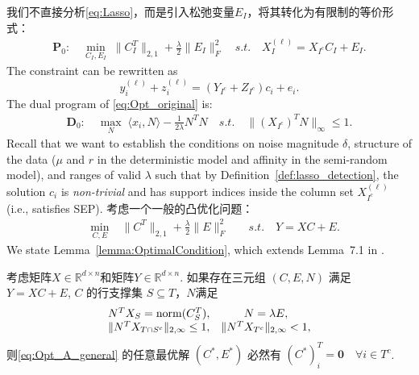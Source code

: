\documentclass{ctexart}
\begin{document}
我们不直接分析\eqref{eq:Lasso}，而是引入松弛变量$E_I$，将其转化为有限制的等价形式：
\begin{align}\label{eq:Opt_original}
  \mathbf{P}_0:\quad \min_{C_I, E_I} \;
  \|C_I^T\|_{2,1}+\frac{\lambda}{2}\|E_I\|_F^2 \quad
  s.t. \quad X^{(\ell)}_I=X_{I^c}C_I+E_I.
\end{align}
The constraint can be rewritten as
\begin{equation}\label{eq:Opt_original_equi}
  y^{(\ell)}_i+z^{(\ell)}_i=(Y_{I^c}+Z_{I^c})c_i+e_i.
\end{equation}
The dual program of \eqref{eq:Opt_original} is:
\begin{equation}\label{eq:Opt_original_dual}
  \begin{aligned}
    \mathbf{D}_0:\quad \max_{N} \; \langle x_i,N \rangle - \frac{1}{2\lambda}N^TN \quad
    s.t. \quad \|(X_{I^c})^TN\|_{\infty} \leq 1.
  \end{aligned}
\end{equation}
Recall that we want to establish the conditions on noise magnitude $\delta$, structure of the data ($\mu$ and $r$ in the deterministic model and affinity in the semi-random model), and ranges of valid $\lambda$ such that by Definition~\ref{def:lasso_detection}, the solution $c_i$ is \emph{non-trivial} and has support indices inside the column set $X^{(\ell)}_{I^c}$ (i.e., satisfies SEP).
考虑一个一般的凸优化问题：
\begin{align}\label{eq:Opt_A_general}
  \quad \min_{C, E} \; &\|C^T\|_{2,1}+\frac{\lambda}{2}\|E\|^2_F \quad &s.t. \quad Y=XC+E.
\end{align}
We state Lemma~\ref{lemma:OptimalCondition}, which extends Lemma~7.1 in \cite{soltanolkotabi2011geometric}.
\begin{lemma}\label{lemma:OptimalCondition}
  考虑矩阵$X\in \mathbb{R}^{d\times n}$和矩阵$Y \in \mathbb{R}^{d\times n}$.
  如果存在三元组 $(C,E,N)$ 满足 $Y=XC+E$, $C$ 的行支撑集 $S\subseteq T$，$N$满足
  \begin{equation*}
    \begin{array}{cc}
      N^T X_S = \mathrm{norm}(C_S^T),  & N=\lambda E, \\
      \|N^T X_{T\cap S^{c}}\|_{2, \infty} \leq 1, & \|N^T X_{T^{c}}\|_{2, \infty}<1,
    \end{array}
  \end{equation*}
  则\eqref{eq:Opt_A_general} 的任意最优解 $(C^{*},E^{*})$ 必然有
  $(C^{*})^T_i=\mathbf{0} \quad \forall i \in T^c$.
\end{lemma}
\end{document}
